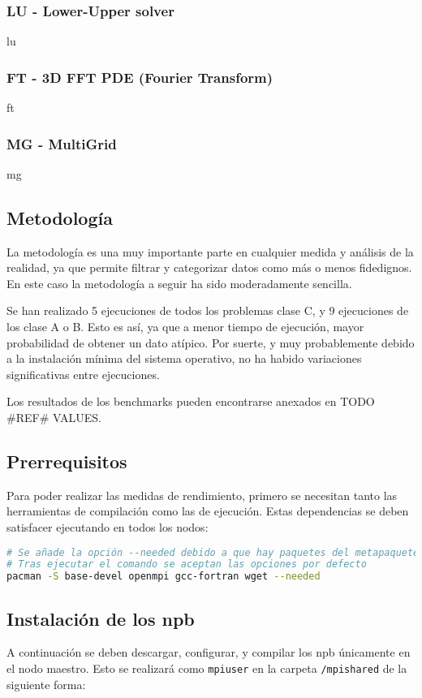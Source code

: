 \subsubsection{LU - Lower-Upper solver}
lu

\subsubsection{FT - 3D FFT PDE (Fourier Transform)}
ft

\subsubsection{MG - MultiGrid}
mg


\subsection{Metodología}
La metodología es una muy importante parte en cualquier medida y análisis de la realidad, ya que permite filtrar y categorizar datos como más o menos fidedignos. En este caso la metodología a seguir ha sido moderadamente sencilla.

Se han realizado 5 ejecuciones de todos los problemas clase C, y 9 ejecuciones de los clase A o B. Esto es así, ya que a menor tiempo de ejecución, mayor probabilidad de obtener un dato atípico. Por suerte, y muy probablemente debido a la instalación mínima del sistema operativo, no ha habido variaciones significativas entre ejecuciones.

Los resultados de los benchmarks pueden encontrarse anexados en TODO \#REF\# VALUES.

\subsection{Prerrequisitos}
Para poder realizar las medidas de rendimiento, primero se necesitan tanto las herramientas de compilación como las de ejecución. Estas dependencias se deben satisfacer ejecutando en todos los nodos:

\begin{lstlisting}[language=bash]
# Se añade la opción --needed debido a que hay paquetes del metapaquete base-devel que ya están instalados, y no es necesario reinstalar.
# Tras ejecutar el comando se aceptan las opciones por defecto
pacman -S base-devel openmpi gcc-fortran wget --needed
\end{lstlisting}

\subsection{Instalación de los \acrshort{npb}}
A continuación se deben descargar, configurar, y compilar los \acrlong{npb} únicamente en el nodo maestro. Esto se realizará como \texttt{mpiuser} en la carpeta \texttt{/mpishared} de la siguiente forma:

